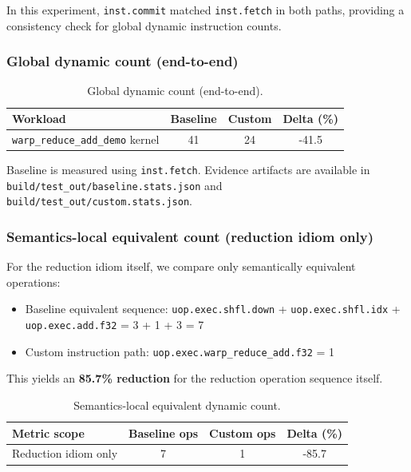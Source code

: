 \documentclass[11pt]{article}
\providecommand{\tightlist}{%
  \setlength{\itemsep}{0pt}\setlength{\parskip}{0pt}}
\begin{document}
In this experiment, \texttt{inst.commit} matched \texttt{inst.fetch} in
both paths, providing a consistency check for global dynamic instruction
counts.

\hypertarget{global-dynamic-count-end-to-end}{%
\subsubsection{Global dynamic count
(end-to-end)}\label{global-dynamic-count-end-to-end}}

\begin{table}[htbp]
\centering
\caption{Global dynamic count (end-to-end).}
\label{tab:global-dynamic-count}
\begin{tabular}{lccc}
\toprule
Workload & Baseline & Custom & Delta (\%) \\
\midrule
\texttt{warp\_reduce\_add\_demo} kernel & 41 & 24 & -41.5 \\
\bottomrule
\end{tabular}
\end{table}

Baseline is measured using \texttt{inst.fetch}. Evidence artifacts are available in
\texttt{build/test\_out/baseline.stats.json} and
\texttt{build/test\_out/custom.stats.json}.

\hypertarget{semantics-local-equivalent-count-reduction-idiom-only}{%
\subsubsection{Semantics-local equivalent count (reduction idiom
only)}\label{semantics-local-equivalent-count-reduction-idiom-only}}

For the reduction idiom itself, we compare only semantically equivalent
operations:

\begin{itemize}
\tightlist
\item
  Baseline equivalent sequence:
  \texttt{uop.exec.shfl.down} + \texttt{uop.exec.shfl.idx} +
  \texttt{uop.exec.add.f32} = 3 + 1 + 3 = 7
\item
  Custom instruction path: \texttt{uop.exec.warp\_reduce\_add.f32} = 1
\end{itemize}

This yields an \textbf{85.7\% reduction} for the reduction operation
sequence itself.

\begin{table}[htbp]
\centering
\caption{Semantics-local equivalent dynamic count.}
\label{tab:local-dynamic-count}
\begin{tabular}{lccc}
\toprule
Metric scope & Baseline ops & Custom ops & Delta (\%) \\
\midrule
Reduction idiom only & 7 & 1 & -85.7 \\
\bottomrule
\end{tabular}
\end{table}
\end{document}
